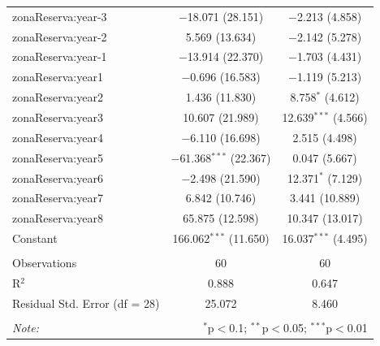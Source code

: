 \documentclass[utf8]{frontiers_suppmat} %
\begin{document}
\begin{table}[!htbp]
\begin{tabular}{@{\extracolsep{1pt}}lcc}
  zonaReserva:year-3 & $-$18.071 (28.151) & $-$2.213 (4.858) \\ 
  zonaReserva:year-2 & 5.569 (13.634) & $-$2.142 (5.278) \\ 
  zonaReserva:year-1 & $-$13.914 (22.370) & $-$1.703 (4.431) \\ 
  zonaReserva:year1 & $-$0.696 (16.583) & $-$1.119 (5.213) \\ 
  zonaReserva:year2 & 1.436 (11.830) & 8.758$^{*}$ (4.612) \\ 
  zonaReserva:year3 & 10.607 (21.989) & 12.639$^{***}$ (4.566) \\ 
  zonaReserva:year4 & $-$6.110 (16.698) & 2.515 (4.498) \\ 
  zonaReserva:year5 & $-$61.368$^{***}$ (22.367) & 0.047 (5.667) \\ 
  zonaReserva:year6 & $-$2.498 (21.590) & 12.371$^{*}$ (7.129) \\ 
  zonaReserva:year7 & 6.842 (10.746) & 3.441 (10.889) \\ 
  zonaReserva:year8 & 65.875 (12.598) & 10.347 (13.017) \\ 
  Constant & 166.062$^{***}$ (11.650) & 16.037$^{***}$ (4.495) \\ 
 \hline \\[-1.8ex] 
Observations & 60 & 60 \\ 
R$^{2}$ & 0.888 & 0.647 \\ 
Residual Std. Error (df = 28) & 25.072 & 8.460 \\ 
\hline 
\hline \\[-1.8ex] 
\textit{Note:}  & \multicolumn{2}{r}{$^{*}$p$<$0.1; $^{**}$p$<$0.05; $^{***}$p$<$0.01} \\ 
\end{tabular} 
\end{table}

\clearpage
\end{document}
